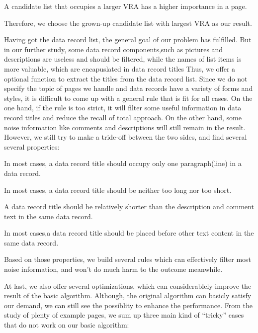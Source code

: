 \begin{newproperty}\label{prop-2}
A candidate list that occupies a larger VRA has a higher importance in a page.
\end{newproperty}

Therefore, we choose the grown-up candidate list with largest VRA as our result.


Having got the data record list, 
the general goal of our problem has fulfilled.
But in our further study,
some data record components,such as pictures and descriptions are useless and should be filtered,
while the names of list items is more valuable, which are encapuslated in data record titles
Thus, we offer a optional function to extract the titles from the data record list.
Since we do not specify the topic of pages we handle
and data records have a variety of forms and styles,
it is difficult to come up with a general rule that is fit for all cases.
On the one hand, if the rule is too strict, 
it will filter some useful information in data record titles and reduce the recall of total approach.
On the other hand, 
some noise information like comments and descriptions will still remain in the result.
However, we still try to make a tride-off between the two sides, and find several several properties:
\begin{newproperty}\label{prop-3}
In most cases, a data record title should occupy only one paragraph(line) in a data record.
\end{newproperty}

\begin{newproperty}\label{prop-4}
In most cases, a data record title should be neither too long nor too short.
\end{newproperty}

\begin{newproperty}\label{prop-5}
A data record title should be relatively shorter than the description and comment text in the same data record.
\end{newproperty}

\begin{newproperty}\label{prop-6}
In most cases,a data record title should be placed before other text content in the same data record.
\end{newproperty}

 
Based on those properties, 
we build several rules which can effectively filter most noise information,
and won't do much harm to the outcome meanwhile.


At last, we also offer several optimizations, which can considerablely improve the result of the basic algorithm.
Although, the original algorithm can basicly satisfy our demand, 
we can still see the possiblity to enhance the performance.
From the study of plenty of example pages, we sum up three main kind of ``tricky'' cases that do not work on our basic algorithm:

